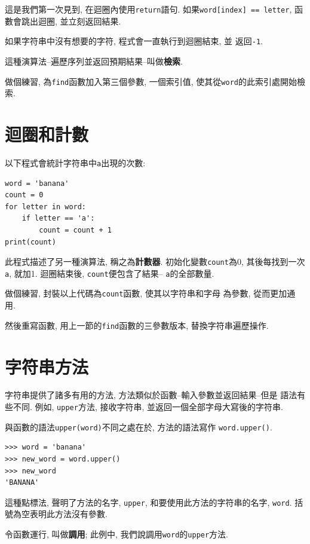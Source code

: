\documentclass[10pt]{book}
\begin{document}
這是我們第一次見到, 在迴圈內使用{\tt return}語句. 
如果{\tt word[index] == letter}, 函數會跳出迴圈, 並立刻返回結果. 

如果字符串中沒有想要的字符, 程式會一直執行到迴圈結束, 並
返回{\tt -1}.

這種演算法--遍歷序列並返回預期結果--叫做{\bf 檢索}. 

做個練習, 為{\tt find}函數加入第三個參數, 一個索引值, 
使其從{\tt word}的此索引處開始檢索.


\section{迴圈和計數}
\label{counter}
以下程式會統計字符串中{\tt a}出現的次數:

\begin{verbatim}
word = 'banana'
count = 0
for letter in word:
    if letter == 'a':
        count = count + 1
print(count)
\end{verbatim}
%
此程式描述了另一種演算法, 稱之為{\bf 計數器}.
初始化變數{\tt count}為0, 其後每找到一次{\tt a}, 就加1.
迴圈結束後,  {\tt count}便包含了結果-- {\tt a}的全部數量.

做個練習, 封裝以上代碼為{\tt count}函數, 使其以字符串和字母
為參數, 從而更加通用. 

然後重寫函數, 用上一節的{\tt find}函數的三參數版本, 替換字符串遍歷操作. 


\section{字符串方法}
\label{optional}
字符串提供了諸多有用的方法, 方法類似於函數--輸入參數並返回結果--但是
語法有些不同. 
例如, {\tt upper}方法, 接收字符串, 
並返回一個全部字母大寫後的字符串. 

與函數的語法{\tt upper(word)}不同之處在於, 
方法的語法寫作 {\tt word.upper()}.

\begin{verbatim}
>>> word = 'banana'
>>> new_word = word.upper()
>>> new_word
'BANANA'
\end{verbatim}
%
這種點標法, 聲明了方法的名字, {\tt upper}, 
和要使用此方法的字符串的名字, {\tt word}. 
括號為空表明此方法沒有參數. 

令函數運行, 叫做{\bf 調用};
此例中, 我們說調用{\tt word}的{\tt upper}方法. 
\end{document}
